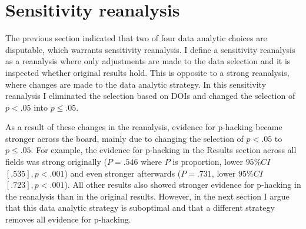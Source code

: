 \section*{Sensitivity reanalysis}
The previous section indicated that two of four data analytic choices are disputable, which warrants sensitivity reanalysis. I define a sensitivity reanalysis as a reanalysis where only adjustments are made to the data selection and it is inspected whether original results hold. This is opposite to a strong reanalysis, where changes are made to the data analytic strategy. In this sensitivity reanalysis I eliminated the selection based on DOIs and changed the selection of $p<.05$ into $p\leq.05$.

As a result of these changes in the reanalysis, evidence for p-hacking became stronger across the board, mainly due to changing the selection of $p<.05$ to $p\leq.05$. For example, the evidence for p-hacking in the Results section across all fields was strong originally ($P=.546$ where $P$ is proportion, lower $95\%CI$ $[.535],p<.001$) and even stronger afterwards ($P=.731$, lower $95\%CI$ $[.723],p<.001$). All other results also showed stronger evidence for p-hacking in the reanalysis than in the original results. However, in the next section I argue that this data analytic strategy is suboptimal and that a different strategy removes all evidence for p-hacking.